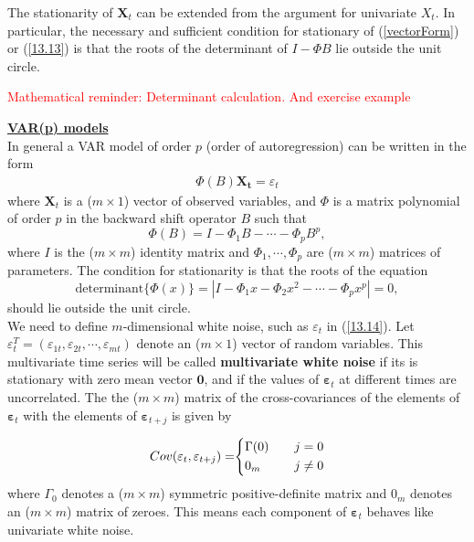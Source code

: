 The stationarity of $\mathbf{X}_t$ can be extended from the argument for univariate $X_t$. In particular, the necessary and sufficient condition for stationary of (\ref{vectorForm}) or (\ref{13.13}) is that the roots of the determinant of $I-\Phi B$ lie outside the unit circle. 

\textcolor{red}{Mathematical reminder: Determinant calculation. And exercise example}


\bigskip
\noindent
\textbf{\underline{VAR(p) models}}\\

In general a VAR model of order $p$ (order of autoregression) can be written in the form \begin{align}
    \Phi(B) \mathbf{X_t} = \varepsilon_t \label{13.14}
\end{align} where $\mathbf{X}_t$ is a ($m\times 1$) vector of observed variables, and $\Phi$ is a matrix polynomial of order $p$ in the backward shift operator $B$ such that \[
\Phi(B)=I- \Phi_1 B- \cdots - \Phi_p B^p,
\] where $I$ is the ($m\times m$) identity matrix and $\Phi_1, \cdots, \Phi_p$ are ($m\times m$) matrices of parameters. The condition for stationarity is that the roots of the equation \[
\text{determinant}\{\Phi(x)\} = |I-\Phi_1x - \Phi_2 x^2 - \cdots - \Phi_px^p|=0,
\] should lie outside the unit circle.\\

We need to define $m$-dimensional white noise, such as $\varepsilon_t$ in (\ref{13.14}). Let $\varepsilon_t^T=(\varepsilon_{1t},\varepsilon_{2t},\cdots,\varepsilon_{mt})$ denote an ($m \times 1$) vector of random variables. This multivariate time series will be called \textbf{multivariate white noise} if its is stationary with zero mean vector $\mathbf{0}$, and if the values of $\mathbf{\varepsilon}_t$ at different times are uncorrelated. The the ($m\times m$) matrix of the cross-covariances of the elements of $\mathbf{\varepsilon}_t$ with the elements of $\mathbf{\varepsilon}_{t+j}$ is given by 

\begin{subequations}
\begin{equation}
\begin{array}{r@{}l}
Cov(\mathbf{\varepsilon}_t, \mathbf{\varepsilon}_{t+j}) = & \left\{
\begin{aligned}
    &\Gamma(0) & \quad & j=0 \nonumber \\
    &0_m & \quad & j \neq 0 \nonumber
\end{aligned}
\right.
\end{array}
\end{equation}
\end{subequations}
where $\Gamma_0$ denotes a ($m\times m$) symmetric positive-definite matrix and $0_m$ denotes an ($m \times m$) matrix of zeroes. This means each component of $\mathbf{\varepsilon}_t$ behaves like univariate white noise.\\

